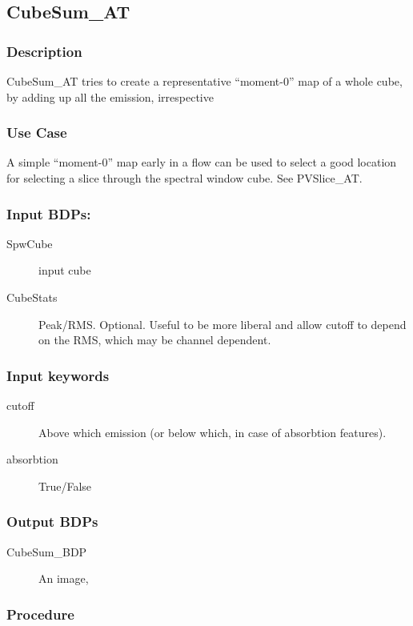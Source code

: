 
\subsection{CubeSum\_AT}

\subsubsection{Description}

CubeSum\_AT tries to create a representative ``moment-0'' map of a whole cube,
by adding up all the emission, irrespective


\subsubsection{Use Case}

A simple ``moment-0'' map early in a flow can be used to select a good location
for selecting a slice through the spectral window cube.  See PVSlice\_AT.

\subsubsection{Input BDPs:}


\begin{description}

\item[SpwCube] input cube

\item[CubeStats] Peak/RMS. Optional. Useful to be more liberal and allow cutoff to depend on
the RMS, which may be channel dependent.

\end{description}


\subsubsection{Input keywords}

\begin{description}
\item[cutoff] Above which emission (or below which, in case of absorbtion features).

\item[absorbtion]  True/False


\end{description}

\subsubsection{Output BDPs}

\begin{description}
\item[CubeSum\_BDP] An image, 

\end{description}


\subsubsection{Procedure}

\clearpage

